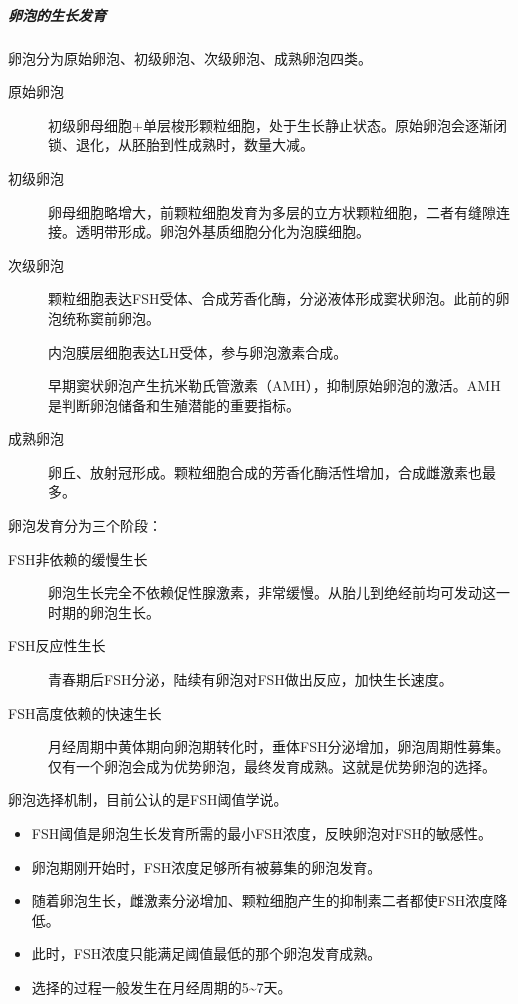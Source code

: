 \subparagraph{卵泡的生长发育}

卵泡分为原始卵泡、初级卵泡、次级卵泡、成熟卵泡四类。

\begin{description}
	\item[原始卵泡] 初级卵母细胞+单层梭形颗粒细胞，处于生长静止状态。原始卵泡会逐渐闭锁、退化，从胚胎到性成熟时，数量大减。
	\item[初级卵泡] 卵母细胞略增大，前颗粒细胞发育为多层的立方状颗粒细胞，二者有缝隙连接。透明带形成。卵泡外基质细胞分化为泡膜细胞。
	\item[次级卵泡] 颗粒细胞表达FSH受体、合成芳香化酶，分泌液体形成窦状卵泡。此前的卵泡统称窦前卵泡。
	
	\hspace{2em} 内泡膜层细胞表达LH受体，参与卵泡激素合成。
	
	\hspace{2em} 早期窦状卵泡产生抗米勒氏管激素（AMH），抑制原始卵泡的激活。AMH是判断卵泡储备和生殖潜能的重要指标。
	\item[成熟卵泡] 卵丘、放射冠形成。颗粒细胞合成的芳香化酶活性增加，合成雌激素也最多。
\end{description}

卵泡发育分为三个阶段：

\begin{description}
	\item[FSH非依赖的缓慢生长] 卵泡生长完全不依赖促性腺激素，非常缓慢。从胎儿到绝经前均可发动这一时期的卵泡生长。
	\item[FSH反应性生长] 青春期后FSH分泌，陆续有卵泡对FSH做出反应，加快生长速度。
	\item[FSH高度依赖的快速生长] 月经周期中黄体期向卵泡期转化时，垂体FSH分泌增加，卵泡周期性募集。仅有一个卵泡会成为优势卵泡，最终发育成熟。这就是优势卵泡的选择。
\end{description}

卵泡选择机制，目前公认的是FSH阈值学说。

\begin{itemize}
	\item FSH阈值是卵泡生长发育所需的最小FSH浓度，反映卵泡对FSH的敏感性。
	\item 卵泡期刚开始时，FSH浓度足够所有被募集的卵泡发育。
	\item 随着卵泡生长，雌激素分泌增加、颗粒细胞产生的抑制素二者都使FSH浓度降低。
	\item 此时，FSH浓度只能满足阈值最低的那个卵泡发育成熟。
	\item 选择的过程一般发生在月经周期的5\textasciitilde7天。
\end{itemize}

